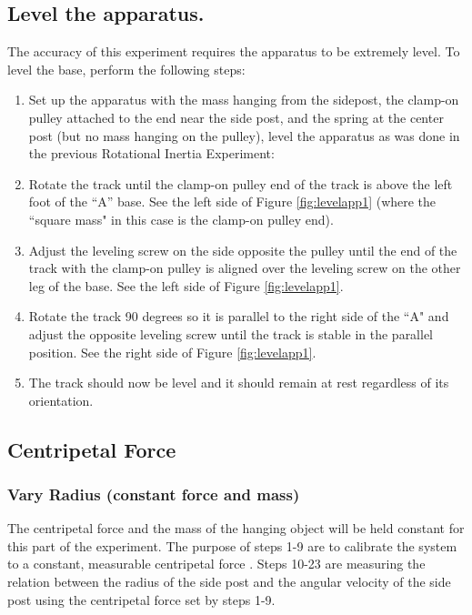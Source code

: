 \subsection{Level the apparatus.}
The accuracy of this experiment requires the apparatus to be extremely level. To level the base, perform the following steps:

\begin{enumerate}
	\item Set up the apparatus with the mass hanging from the sidepost, the clamp-on pulley attached to the end near the side post, and the spring at the center post (but no mass hanging on the pulley), level the apparatus as was done in the previous Rotational Inertia Experiment:
	\item Rotate the track until the clamp-on pulley end of the track  is above the left foot of the ``A'' base. See the left side of Figure \ref{fig:levelapp1} (where the ``square mass" in this case is the  clamp-on pulley end).
	\item Adjust the leveling screw on the side opposite the pulley until the end of the track with the clamp-on pulley  is aligned over the leveling screw on the other leg of the base. See the left side of Figure \ref{fig:levelapp1}.
	\item Rotate the track 90 degrees so it is parallel to the right side of the ``A" and adjust the opposite leveling screw until the track is stable in the parallel position. See the right side of Figure \ref{fig:levelapp1}.
	\item The track should now be level and it should remain at rest regardless of its orientation.
\end{enumerate}

\subsection{Centripetal Force}
\subsubsection{Vary Radius (constant force and mass)}
\label{varyr}
\noindent The centripetal force and the mass of the hanging object will be held constant for this part of the experiment. The purpose of steps 1-9 are to calibrate the system to a constant, measurable centripetal force . Steps 10-23 are measuring the relation between the radius of the side post and the angular velocity of the side post using the centripetal force set by steps 1-9.

